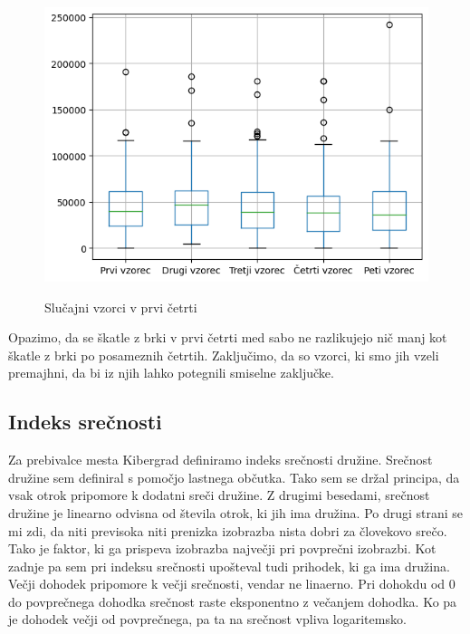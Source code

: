 \documentclass{article}
\begin{document}
\begin{figure}[H]
    \caption{Slučajni vzorci v prvi četrti}
    \centering
    \includegraphics[scale=0.8]{vzorci_severne_cetrti.png}
    \label{fig:slika2}
\end{figure}

Opazimo, da se škatle z brki v prvi četrti med sabo ne razlikujejo nič manj kot škatle z brki po posameznih četrtih. Zaključimo, da so vzorci, ki 
smo jih vzeli premajhni, da bi iz njih lahko potegnili smiselne zaključke. 



\subsection{Indeks srečnosti}

Za prebivalce mesta Kibergrad definiramo indeks srečnosti družine. Srečnost družine sem definiral s pomočjo lastnega občutka. Tako sem se držal principa, da 
vsak otrok pripomore k dodatni sreči družine. Z drugimi besedami, srečnost družine je linearno odvisna od števila otrok, ki jih ima družina. Po drugi strani se mi zdi, da niti previsoka 
niti prenizka izobrazba nista dobri za človekovo srečo. Tako je faktor, ki ga prispeva izobrazba največji pri povprečni izobrazbi. Kot zadnje pa sem pri indeksu srečnosti upošteval tudi 
prihodek, ki ga ima družina. Večji dohodek pripomore k večji srečnosti, vendar ne linaerno. Pri dohokdu od 0 do povprečnega dohodka srečnost raste eksponentno z večanjem dohodka. Ko pa je dohodek 
večji od povprečnega, pa ta na srečnost vpliva logaritemsko. 
\end{document}
